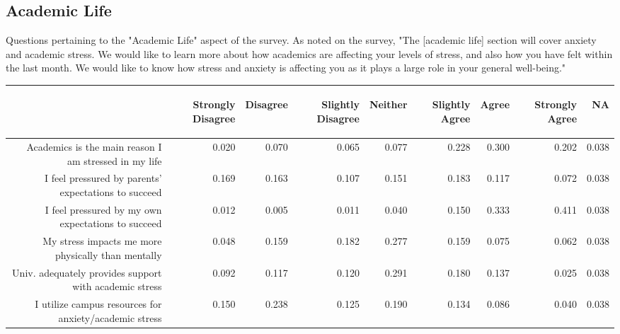 \documentclass{article}\usepackage[]{graphicx}\usepackage[]{color}
\begin{document}
\subsection{Academic Life}
Questions pertaining to the "Academic Life" aspect of the survey. As noted on the survey, "The [academic life] section will cover anxiety and academic stress.  We would like to learn more about how academics are affecting your levels of stress, and also how you have felt within the last month.  We would like to know how stress and anxiety is affecting you as it plays a large role in your general well-being."
\begin{table}[ht]
\centering
\begin{tabular}{rrrrrrrrr}
  \hline
 & \begin{sideways} Strongly Disagree \end{sideways} & \begin{sideways} Disagree \end{sideways} & \begin{sideways} Slightly Disagree \end{sideways} & \begin{sideways} Neither \end{sideways} & \begin{sideways} Slightly Agree \end{sideways} & \begin{sideways} Agree \end{sideways} & \begin{sideways} Strongly Agree \end{sideways} & \begin{sideways} NA \end{sideways} \\ 
  \hline
Academics is the main reason I am stressed in my life & 0.020 & 0.070 & 0.065 & 0.077 & 0.228 & 0.300 & 0.202 & 0.038 \\ 
  I feel pressured by parents' expectations to succeed & 0.169 & 0.163 & 0.107 & 0.151 & 0.183 & 0.117 & 0.072 & 0.038 \\ 
  I feel pressured by my own expectations to succeed & 0.012 & 0.005 & 0.011 & 0.040 & 0.150 & 0.333 & 0.411 & 0.038 \\ 
  My stress impacts me more physically than mentally & 0.048 & 0.159 & 0.182 & 0.277 & 0.159 & 0.075 & 0.062 & 0.038 \\ 
  Univ. adequately provides support with academic stress & 0.092 & 0.117 & 0.120 & 0.291 & 0.180 & 0.137 & 0.025 & 0.038 \\ 
  I utilize campus resources for anxiety/academic stress & 0.150 & 0.238 & 0.125 & 0.190 & 0.134 & 0.086 & 0.040 & 0.038 \\ 
   \hline
\end{tabular}
\end{table}
\end{document}
